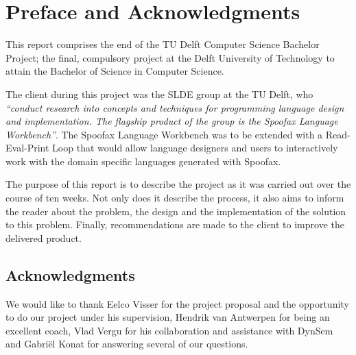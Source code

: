 \chapter{Preface and Acknowledgments}
\label{cha:preface-acks}

This report comprises the end of the TU Delft Computer Science Bachelor Project;
the final, compulsory project at the Delft University of Technology to attain
the Bachelor of Science in Computer Science.

The client during this project was the SLDE group at the TU Delft, who
\textit{``conduct research into concepts and techniques for programming language
design and implementation. The flagship product of the group is the Spoofax
Language Workbench''}. The Spoofax Language Workbench was to be extended with a
Read-Eval-Print Loop that would allow language designers and users to
interactively work with the domain specific languages generated with Spoofax.

The purpose of this report is to describe the project as it was carried out over
the course of ten weeks. Not only does it describe the process, it also aims to
inform the reader about the problem, the design and the implementation of the
solution to this problem. Finally, recommendations are made to the client to
improve the delivered product.

\section*{Acknowledgments}

We would like to thank Eelco Visser for the project proposal and the
opportunity to do our project under his supervision, Hendrik van Antwerpen for
being an excellent coach, Vlad Vergu for his collaboration and assistance with
DynSem and Gabri\"el Konat for answering several of our questions.

